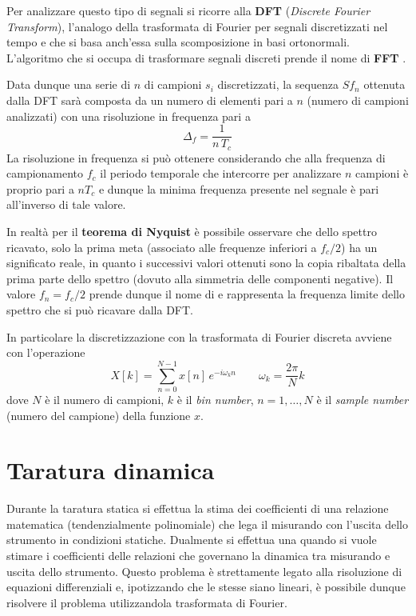 		Per analizzare questo tipo di segnali si ricorre alla  \textbf{DFT} (\textit{Discrete Fourier Transform}), l'analogo della trasformata di Fourier per segnali discretizzati nel tempo e che si basa anch'essa sulla scomposizione in basi ortonormali. L'algoritmo  che si occupa di trasformare segnali discreti prende il nome di \textbf{FFT} .
		
		Data dunque una serie di $n$ di campioni $s_i$ discretizzati, la sequenza $Sf_n$ ottenuta dalla DFT sarà composta da un numero di elementi pari a $n$ (numero di campioni analizzati) con una risoluzione in frequenza pari a 
		\[ \Delta_f = \frac 1 {n\,T_c}\]
		La risoluzione in frequenza si può ottenere considerando che alla frequenza di campionamento $f_c$ il periodo temporale che intercorre per analizzare $n$ campioni è proprio pari a $n T_c$ e dunque la minima frequenza presente nel segnale è pari all'inverso di tale valore.
		
		In realtà per il \textbf{teorema di Nyquist} è possibile osservare che dello spettro ricavato, solo la prima meta (associato alle frequenze inferiori a $f_c/2$) ha un significato reale, in quanto i successivi valori ottenuti sono la copia ribaltata della prima parte dello spettro (dovuto alla simmetria delle componenti negative). Il valore $f_n = f_c/2$ prende dunque il nome di  e rappresenta la frequenza limite dello spettro che si può ricavare dalla DFT.
		
		
		In particolare la discretizzazione con la trasformata di Fourier discreta avviene con l'operazione
		\[ X[k] = \sum_{n=0}^{N-1} x[n] \, e^{-i\omega_k n} \qquad \omega_k = \frac {2\pi} N k \]
		dove $N$ è il numero di campioni, $k$ è il \textit{bin number}, $n = 1,\dots, N$ è il \textit{sample number} (numero del campione) della funzione $x$.
		
\section{Taratura dinamica}
		
		Durante la taratura statica si effettua la stima dei coefficienti di una relazione matematica (tendenzialmente polinomiale) che lega il misurando con l'uscita dello strumento in condizioni statiche. Dualmente si effettua una  quando si vuole stimare i coefficienti delle relazioni che governano la dinamica tra misurando e uscita dello strumento. Questo problema è strettamente legato alla risoluzione di equazioni differenziali e, ipotizzando che le stesse siano lineari, è possibile dunque risolvere il problema utilizzandola trasformata di Fourier.
		
